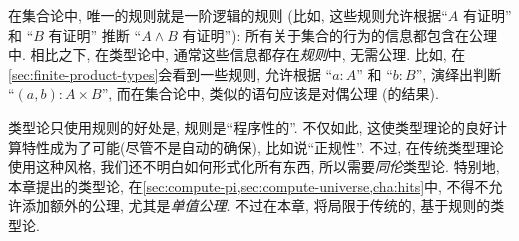 在集合论中, 唯一的规则就是一阶逻辑的规则 (比如, 这些规则允许根据``$A$ 有证明'' 和 ``$B$ 有证明'' 推断 ``$A\wedge B$ 有证明''): 所有关于集合的行为的信息都包含在公理中.
相比之下, 在类型论中, 通常这些信息都存在\emph{规则}中, 无需公理.
比如, 在\cref{sec:finite-product-types}会看到一些规则, 允许根据 ``$a:A$'' 和 ``$b:B$'', 演绎出判断 ``$(a,b):A\times B$'', 而在集合论中, 类似的语句应该是对偶公理 (的结果).

类型论只使用规则的好处是, 规则是``程序性的''.
不仅如此, 这使类型理论的良好计算特性成为了可能(尽管不是自动的确保), 比如说``正规性''.
%
不过, 在传统类型理论使用这种风格, 我们还不明白如何形式化所有东西, 所以需要\emph{同伦}类型论.
特别地, 本章提出的类型论, 在\cref{sec:compute-pi,sec:compute-universe,cha:hits}中, 不得不允许添加额外的公理, 尤其是\emph{单值公理}.
不过在本章, 将局限于传统的, 基于规则的类型论.